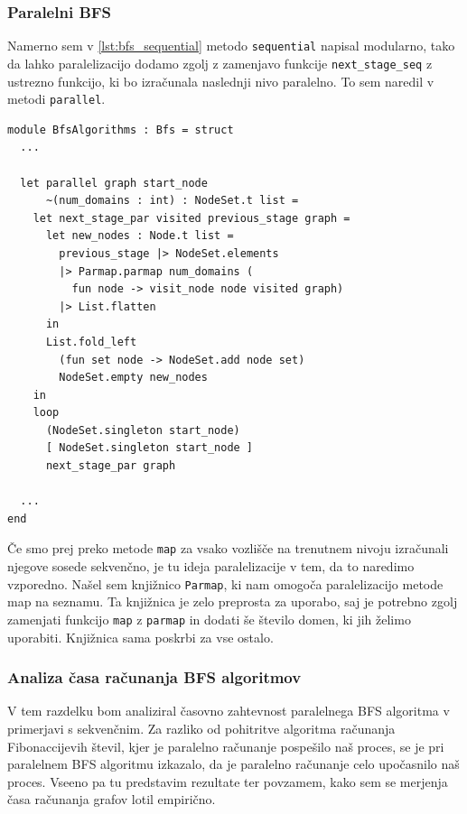 \documentclass[mat1, tisk]{fmfdelo}
\begin{document}
\subsubsection{Paralelni BFS}

Namerno sem v \ref{lst:bfs_sequential} metodo \texttt{sequential} napisal modularno, tako da lahko paralelizacijo
dodamo zgolj z zamenjavo funkcije \texttt{next\_stage\_seq} z ustrezno funkcijo, ki bo izračunala naslednji nivo
paralelno. To sem naredil v metodi \texttt{parallel}.

\begin{lstlisting}[label=lst:bfs_parallel]
module BfsAlgorithms : Bfs = struct
  ...

  let parallel graph start_node
      ~(num_domains : int) : NodeSet.t list =
    let next_stage_par visited previous_stage graph =
      let new_nodes : Node.t list =
        previous_stage |> NodeSet.elements
        |> Parmap.parmap num_domains (
          fun node -> visit_node node visited graph)
        |> List.flatten
      in
      List.fold_left
        (fun set node -> NodeSet.add node set)
        NodeSet.empty new_nodes
    in
    loop
      (NodeSet.singleton start_node)
      [ NodeSet.singleton start_node ]
      next_stage_par graph

  ...
end

\end{lstlisting}

Če smo prej preko metode \texttt{map} za vsako vozlišče na trenutnem nivoju izračunali njegove sosede sekvenčno,
je tu ideja paralelizacije v tem, da to naredimo vzporedno. Našel sem knjižnico \texttt{Parmap}, ki nam omogoča
paralelizacijo metode map na seznamu. Ta knjižnica je zelo preprosta za uporabo, saj je potrebno zgolj zamenjati
funkcijo \texttt{map} z \texttt{parmap} in dodati še število domen, ki jih želimo uporabiti. Knjižnica sama poskrbi
za vse ostalo.

\subsubsection{Analiza časa računanja BFS algoritmov}

V tem razdelku bom analiziral časovno zahtevnost paralelnega BFS algoritma v primerjavi s sekvenčnim.
Za razliko od pohitritve algoritma računanja Fibonaccijevih števil, kjer je paralelno računanje pospešilo naš proces,
se je pri paralelnem BFS algoritmu izkazalo, da je paralelno računanje celo upočasnilo naš proces. Vseeno
pa tu predstavim rezultate ter povzamem, kako sem se merjenja časa računanja grafov lotil empirično.
\end{document}
